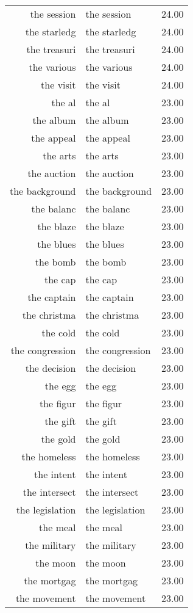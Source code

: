 \begin{table}[ht]
\begin{tabular}{rlr}
  the session & the session & 24.00 \\ 
  the starledg & the starledg & 24.00 \\ 
  the treasuri & the treasuri & 24.00 \\ 
  the various & the various & 24.00 \\ 
  the visit & the visit & 24.00 \\ 
  the al & the al & 23.00 \\ 
  the album & the album & 23.00 \\ 
  the appeal & the appeal & 23.00 \\ 
  the arts & the arts & 23.00 \\ 
  the auction & the auction & 23.00 \\ 
  the background & the background & 23.00 \\ 
  the balanc & the balanc & 23.00 \\ 
  the blaze & the blaze & 23.00 \\ 
  the blues & the blues & 23.00 \\ 
  the bomb & the bomb & 23.00 \\ 
  the cap & the cap & 23.00 \\ 
  the captain & the captain & 23.00 \\ 
  the christma & the christma & 23.00 \\ 
  the cold & the cold & 23.00 \\ 
  the congression & the congression & 23.00 \\ 
  the decision & the decision & 23.00 \\ 
  the egg & the egg & 23.00 \\ 
  the figur & the figur & 23.00 \\ 
  the gift & the gift & 23.00 \\ 
  the gold & the gold & 23.00 \\ 
  the homeless & the homeless & 23.00 \\ 
  the intent & the intent & 23.00 \\ 
  the intersect & the intersect & 23.00 \\ 
  the legislation & the legislation & 23.00 \\ 
  the meal & the meal & 23.00 \\ 
  the military & the military & 23.00 \\ 
  the moon & the moon & 23.00 \\ 
  the mortgag & the mortgag & 23.00 \\ 
  the movement & the movement & 23.00 \\ 

\end{tabular}
\end{table}
